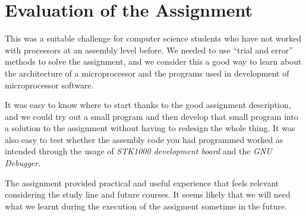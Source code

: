 \section{Evaluation of the Assignment}

This was a suitable challenge for computer science students who have not
worked with processors at an assembly level before. We needed to use
``trial and error'' methods to solve the assignment, and we consider
this a good way to learn about the architecture of a microprocessor and
the programs used in development of microprocessor software.

It was easy to know where to start thanks to the good assignment
description, and we could try out a small program and then develop that
small program into a solution to the assignment without having to
redesign the whole thing. It was also easy to test whether the assembly
code you had programmed worked as intended through the usage of {\em
STK1000 development board} and the {\em GNU Debugger}.

The assignment provided practical and useful experience that feels
relevant considering the study line and future courses. It seems likely
that we will need what we learnt during the execution of the assigment
sometime in the future.

\begin{comment}
Writing such a thorough report is a relatively new activity for the
members of our group, so we were a little uncertain as to how thorough
the report was supposed to be. An example report for some assignment in
the same field would useful, so that we would know whether we're doing
it right or not. The approximate expected report length could also have
been specified.
\end{comment}
